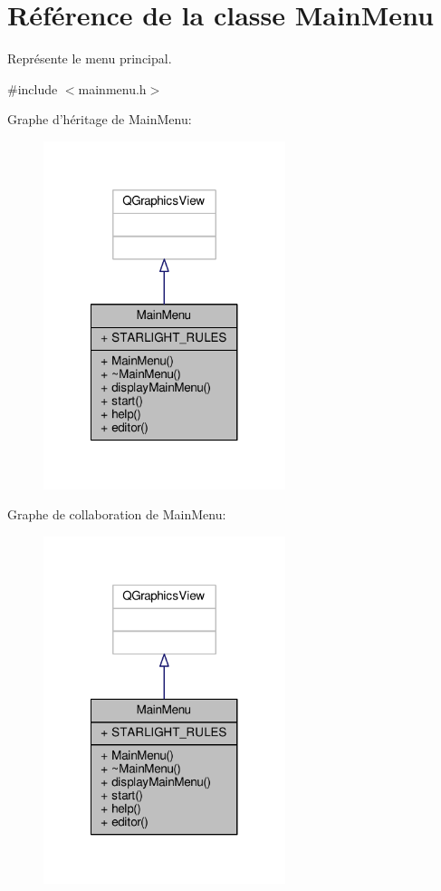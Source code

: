 \hypertarget{classMainMenu}{\section{Référence de la classe Main\+Menu}
\label{classMainMenu}
}


Représente le menu principal.  




{\ttfamily \#include $<$mainmenu.\+h$>$}



Graphe d'héritage de Main\+Menu\+:\nopagebreak
\begin{figure}[H]
\begin{center}
\leavevmode
\includegraphics[width=200pt]{db/d55/classMainMenu__inherit__graph}
\end{center}
\end{figure}


Graphe de collaboration de Main\+Menu\+:\nopagebreak
\begin{figure}[H]
\begin{center}
\leavevmode
\includegraphics[width=200pt]{d8/d60/classMainMenu__coll__graph}
\end{center}
\end{figure}
